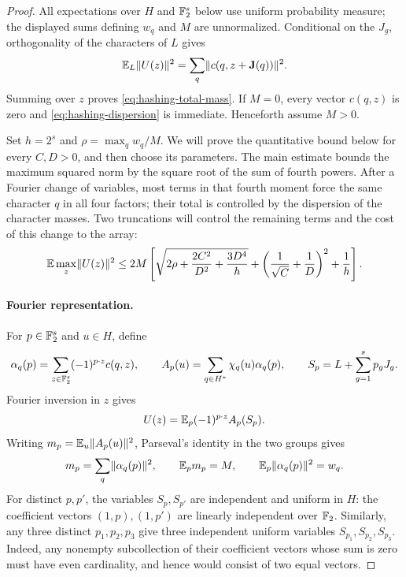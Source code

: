 \begin{proof}
All expectations over $H$ and $\mathbb F_2^s$ below use uniform probability measure;
the displayed sums defining $w_q$ and $M$ are unnormalized.  Conditional on
the $J_g$, orthogonality of the characters of $L$ gives
\[
 \mathbb E_L\lVert U(z)\rVert^2
 =\sum_q\lVert c(q,z+\mathbf J(q))\rVert^2.
\]
Summing over $z$ proves \eqref{eq:hashing-total-mass}.  If $M=0$, every vector
$c(q,z)$ is zero and \eqref{eq:hashing-dispersion} is immediate.  Henceforth
assume $M>0$.

Set $h=2^s$ and $\rho=\max_q w_q/M$. We will prove the quantitative
bound below for every $C,D>0$, and then choose its parameters.
The main estimate bounds the maximum squared norm by the square root of
the sum of fourth powers. After a Fourier change of variables, most terms
in that fourth moment force the same character $q$ in all four factors;
their total is controlled by the dispersion of the character masses.
Two truncations will control the remaining terms and the cost of this
change to the array:
\begin{equation}\label{eq:hashing-quantitative}
 \mathbb E\max_z\lVert U(z)\rVert^2
 \le 2M\left[
 \sqrt{2\rho+\frac{2C^2}{D^2}+\frac{3D^4}{h}}
 +\left(\frac1{\sqrt C}+\frac1D\right)^2+\frac1h
 \right].
\end{equation}


\paragraph{Fourier representation.}
For $p\in\mathbb F_2^s$ and $u\in H$, define
\[
 \alpha_q(p)=\sum_{z\in\mathbb F_2^s}(-1)^{p\cdot z}c(q,z),
 \qquad
 A_p(u)=\sum_{q\in H^*}\chi_q(u)\alpha_q(p),
 \qquad
 S_p=L+\sum_{g=1}^s p_gJ_g.
\]
Fourier inversion in $z$ gives
\begin{equation}\label{eq:hashing-inversion}
 U(z)=\mathbb E_p(-1)^{p\cdot z}A_p(S_p).
\end{equation}
Writing $m_p=\mathbb E_u\lVert A_p(u)\rVert^2$, Parseval's identity in the two groups gives
\begin{equation}\label{eq:hashing-parseval}
 m_p=\sum_q\lVert\alpha_q(p)\rVert^2,
 \qquad \mathbb E_p m_p=M,
 \qquad \mathbb E_p\lVert\alpha_q(p)\rVert^2=w_q.
\end{equation}
For distinct $p,p'$, the variables $S_p,S_{p'}$ are independent and uniform
in $H$: the coefficient vectors $(1,p),(1,p')$ are linearly independent
over $\mathbb F_2$.  Similarly, any three distinct $p_1,p_2,p_3$ give three
independent uniform variables $S_{p_1},S_{p_2},S_{p_3}$.  Indeed, any
nonempty subcollection of their coefficient vectors whose sum is zero
must have even cardinality, and hence would consist of two equal vectors.


\end{proof}
